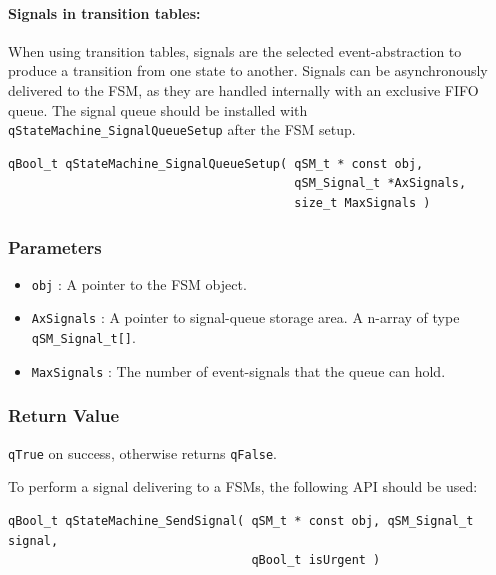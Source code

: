 \documentclass{article}
\begin{document}
\paragraph{Signals in transition tables:}
When using transition tables, signals are the selected event-abstraction to produce a transition from one state to another. Signals can be asynchronously delivered to the FSM, as they are handled internally with an exclusive FIFO queue. 
The signal queue should be installed with \lstinline{qStateMachine_SignalQueueSetup} after the FSM setup. \\

\begin{lstlisting}[style=CStyle]
qBool_t qStateMachine_SignalQueueSetup( qSM_t * const obj, 
                                        qSM_Signal_t *AxSignals, 
                                        size_t MaxSignals )
\end{lstlisting} 

\subsubsection*{Parameters}
\begin{itemize}
    \item \lstinline{obj} : A pointer to the FSM object. 
    \item \lstinline{AxSignals} : A pointer to signal-queue storage area. A n-array of type \lstinline{qSM_Signal_t[]}.
    \item \lstinline{MaxSignals} : The number of event-signals that the queue can hold.
\end{itemize}

\subsubsection*{Return Value}
\lstinline{qTrue} on success, otherwise returns \lstinline{qFalse}.

\hrulefill
\newline

To perform a signal delivering to a FSMs, the following API should be used: \\

\begin{lstlisting}[style=CStyle]
qBool_t qStateMachine_SendSignal( qSM_t * const obj, qSM_Signal_t signal, 
                                  qBool_t isUrgent )
\end{lstlisting} 
\end{document}
